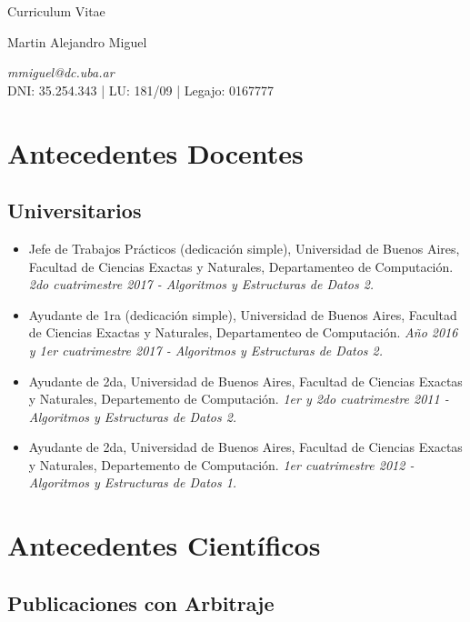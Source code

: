 \documentclass[a4paper,10pt]{article}
\begin{document}
\begin{center}
    { \Huge
    Curriculum Vitae}
\bigskip

{\Large Martin Alejandro Miguel} \\
\medskip

\emph{mmiguel@dc.uba.ar} \\
DNI: 35.254.343 | LU: 181/09 | Legajo: 0167777
\end{center}


\section{Antecedentes Docentes}

\subsection{Universitarios}

\begin{itemize}
    \item Jefe de Trabajos Prácticos (dedicación simple), Universidad de Buenos
        Aires, Facultad de Ciencias Exactas y Naturales, Departamenteo de
        Computación. \emph{2do cuatrimestre 2017 - Algoritmos y Estructuras de
        Datos 2.}
    \item Ayudante de 1ra (dedicación simple), Universidad de Buenos Aires,
        Facultad de Ciencias Exactas y Naturales, Departamenteo de Computación.
        \emph{Año 2016 y 1er cuatrimestre 2017 - Algoritmos y Estructuras de
        Datos 2.}
    \item Ayudante de 2da, Universidad de Buenos Aires, Facultad de Ciencias
        Exactas y Naturales, Departemento de Computación. \emph{1er y 2do
        cuatrimestre 2011 - Algoritmos y Estructuras de Datos 2.}
    \item Ayudante de 2da, Universidad de Buenos Aires, Facultad de Ciencias
        Exactas y Naturales, Departemento de Computación. \emph{1er
        cuatrimestre 2012 - Algoritmos y Estructuras de Datos 1.}
\end{itemize}

\section{Antecedentes Científicos}

\subsection{Publicaciones con Arbitraje}
\end{document}

